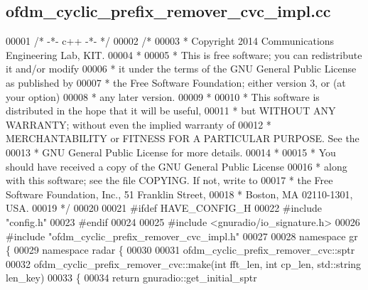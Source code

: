 \subsection{ofdm\+\_\+cyclic\+\_\+prefix\+\_\+remover\+\_\+cvc\+\_\+impl.\+cc}
\label{ofdm__cyclic__prefix__remover__cvc__impl_8cc_source}

\begin{DoxyCode}
00001 \textcolor{comment}{/* -*- c++ -*- */}
00002 \textcolor{comment}{/* }
00003 \textcolor{comment}{ * Copyright 2014 Communications Engineering Lab, KIT.}
00004 \textcolor{comment}{ * }
00005 \textcolor{comment}{ * This is free software; you can redistribute it and/or modify}
00006 \textcolor{comment}{ * it under the terms of the GNU General Public License as published by}
00007 \textcolor{comment}{ * the Free Software Foundation; either version 3, or (at your option)}
00008 \textcolor{comment}{ * any later version.}
00009 \textcolor{comment}{ * }
00010 \textcolor{comment}{ * This software is distributed in the hope that it will be useful,}
00011 \textcolor{comment}{ * but WITHOUT ANY WARRANTY; without even the implied warranty of}
00012 \textcolor{comment}{ * MERCHANTABILITY or FITNESS FOR A PARTICULAR PURPOSE.  See the}
00013 \textcolor{comment}{ * GNU General Public License for more details.}
00014 \textcolor{comment}{ * }
00015 \textcolor{comment}{ * You should have received a copy of the GNU General Public License}
00016 \textcolor{comment}{ * along with this software; see the file COPYING.  If not, write to}
00017 \textcolor{comment}{ * the Free Software Foundation, Inc., 51 Franklin Street,}
00018 \textcolor{comment}{ * Boston, MA 02110-1301, USA.}
00019 \textcolor{comment}{ */}
00020 
00021 \textcolor{preprocessor}{#ifdef HAVE\_CONFIG\_H}
00022 \textcolor{preprocessor}{#include "config.h"}
00023 \textcolor{preprocessor}{#endif}
00024 
00025 \textcolor{preprocessor}{#include <gnuradio/io\_signature.h>}
00026 \textcolor{preprocessor}{#include "ofdm_cyclic_prefix_remover_cvc_impl.h"}
00027 
00028 \textcolor{keyword}{namespace }gr \{
00029   \textcolor{keyword}{namespace }radar \{
00030 
00031     ofdm_cyclic_prefix_remover_cvc::sptr
00032     ofdm_cyclic_prefix_remover_cvc::make(\textcolor{keywordtype}{int} fft\_len, \textcolor{keywordtype}{int} cp\_len, std::string len\_key)
00033     \{
00034       \textcolor{keywordflow}{return} gnuradio::get\_initial\_sptr

\end{DoxyCode}
